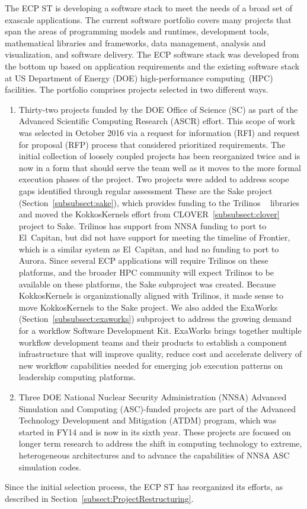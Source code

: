 The ECP ST is developing a software stack to meet the needs of a broad set of exascale applications. The current software portfolio covers many projects that span the areas of programming models and runtimes, development tools, mathematical libraries and frameworks, data management, analysis and visualization, and software delivery. The ECP software stack was developed from the bottom up based on application requirements and the existing software stack at US Department of Energy (DOE) high-performance computing~(HPC) facilities. The portfolio comprises projects selected in two different ways.
\begin{enumerate}
\item Thirty-two projects funded by the DOE Office of Science (SC) as part of the Advanced Scientific Computing Research (ASCR) effort.  This scope of work was selected in October 2016 via a request for information (RFI) and request for proposal (RFP) process that considered prioritized requirements. The initial collection of loosely coupled projects has been reorganized twice and is now in a form that should serve the team well as it moves to the more formal execution phases of the project. Two projects were added to address scope gaps identified through regular assessment These are the Sake project (Section~\ref{subsubsect:sake}), which provides funding to the Trilinos ~\cite{trilinos:homepage} libraries and moved the KokkosKernels effort from CLOVER~\ref{subsubsect:clover} project to Sake.  Trilinos has support from NNSA funding to port to El~Capitan, but did not have support for meeting the timeline of Frontier, which is a similar system as El~Capitan, and had no funding to port to Aurora.  Since several ECP applications will require Trilinos on these platforms, and the broader HPC community will expect Trilinos to be available on these platforms, the Sake subproject was created.  Because KokkosKernels is organizationally aligned with Trilinos, it made sense to move KokkosKernels to the Sake project.  We also added the ExaWorks (Section~\ref{subsubsect:exaworks}) subproject to address the growing demand for a workflow Software Development Kit.  ExaWorks brings together multiple workflow development teams and their products to establish a component infrastructure that will improve quality, reduce cost and accelerate delivery of new workflow capabilities needed for emerging job execution patterns on leadership computing platforms.
\item Three DOE National Nuclear Security Administration (NNSA) Advanced Simulation and Computing (ASC)-funded projects are part of the Advanced Technology Development and Mitigation (ATDM) program, which was started in FY14 and is now in its sixth year. These projects are focused on longer term research to address the shift in computing technology to extreme, heterogeneous architectures and to advance the capabilities of NNSA ASC simulation codes. 
\end{enumerate}
Since the initial selection process, the ECP ST has reorganized its efforts, as described in Section~\ref{subsect:ProjectRestructuring}.

